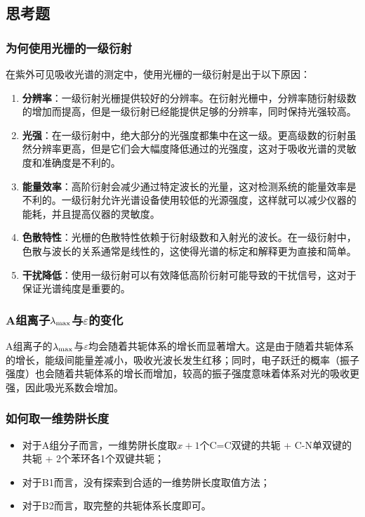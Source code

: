 \subsection{思考题}

\subsubsection{为何使用光栅的一级衍射}

在紫外可见吸收光谱的测定中，使用光栅的一级衍射是出于以下原因：
\begin{enumerate}
    \item \textbf{分辨率}：一级衍射光栅提供较好的分辨率。在衍射光栅中，分辨率随衍射级数的增加而提高，但是一级衍射已经能提供足够的分辨率，同时保持光强较高。
    \item \textbf{光强}：在一级衍射中，绝大部分的光强度都集中在这一级。更高级数的衍射虽然分辨率更高，但是它们会大幅度降低通过的光强度，这对于吸收光谱的灵敏度和准确度是不利的。
    \item \textbf{能量效率}：高阶衍射会减少通过特定波长的光量，这对检测系统的能量效率是不利的。一级衍射允许光谱设备使用较低的光源强度，这样就可以减少仪器的能耗，并且提高仪器的灵敏度。
    \item \textbf{色散特性}：光栅的色散特性依赖于衍射级数和入射光的波长。在一级衍射中，色散与波长的关系通常是线性的，这使得光谱的标定和解释更为直接和简单。
    \item \textbf{干扰降低}：使用一级衍射可以有效降低高阶衍射可能导致的干扰信号，这对于保证光谱纯度是重要的。
\end{enumerate}

\subsubsection{A组离子$\lambda_{\rm max}$与$\varepsilon$的变化}

A组离子的$\lambda_{\rm max}$与$\varepsilon$均会随着共轭体系的增长而显著增大。这是由于随着共轭体系的增长，能级间能量差减小，吸收光波长发生红移；同时，电子跃迁的概率（振子强度）也会随着共轭体系的增长而增加，较高的振子强度意味着体系对光的吸收更强，因此吸光系数会增加。

\subsubsection{如何取一维势阱长度}

\begin{itemize}
    \item 对于A组分子而言，一维势阱长度取$x+1$个C=C双键的共轭 + C-N单双键的共轭 + 2个苯环各1个双键共轭；
    \item 对于B1而言，没有探索到合适的一维势阱长度取值方法；
    \item 对于B2而言，取完整的共轭体系长度即可。
\end{itemize}

